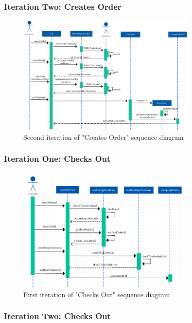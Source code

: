 \subsubsection{Iteration Two: Creates Order}

\begin{figure}[H]
      \centering
      \includegraphics[trim = 0 0 0 0, clip, width=0.8\textwidth]{TempImg/SD1_1.png}
      \caption{Second iteration of "Creates Order" sequence diagram}
\end{figure}

\subsubsection{Iteration One: Checks Out}

\begin{figure}[H]
      \centering
      \includegraphics[trim = 0 0 0 0, clip, width=0.8\textwidth]{TempImg/oldSD1_2.png}
      \caption{First iteration of "Checks Out" sequence diagram}
\end{figure}

\subsubsection{Iteration Two: Checks Out}

